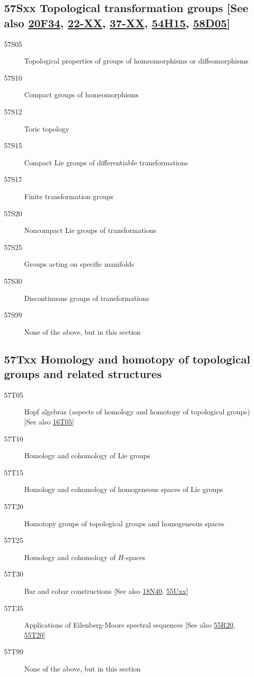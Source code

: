 \documentclass[letterpaper]{article}
\begin{document}
\subsection*{57Sxx  Topological transformation groups [See also \hyperref[20F34]{20F34}, \hyperref[22-XX]{22-XX}, \hyperref[37-XX]{37-XX}, \hyperref[54H15]{54H15}, \hyperref[58D05]{58D05}] }\label{57Sxx}
\begin{description}  
\item [57S05]\label{57S05} Topological properties of groups of homeomorphisms or diffeomorphisms
\item [57S10]\label{57S10} Compact groups of homeomorphisms
\item [57S12]\label{57S12} Toric topology
\item [57S15]\label{57S15} Compact Lie groups of differentiable transformations
\item [57S17]\label{57S17} Finite transformation groups
\item [57S20]\label{57S20} Noncompact Lie groups of transformations
\item [57S25]\label{57S25} Groups acting on specific manifolds
\item [57S30]\label{57S30} Discontinuous groups of transformations
\item [57S99]\label{57S99} None of the above, but in this section
\end{description}
\subsection*{57Txx  Homology and homotopy of topological groups and related structures }\label{57Txx}
\begin{description}  
\item [57T05]\label{57T05} Hopf algebras (aspects of homology and homotopy of topological groups) [See also \hyperref[16T05]{16T05}]
\item [57T10]\label{57T10} Homology and cohomology of Lie groups
\item [57T15]\label{57T15} Homology and cohomology of homogeneous spaces of Lie groups
\item [57T20]\label{57T20} Homotopy groups of topological groups and homogeneous spaces
\item [57T25]\label{57T25} Homology and cohomology of $H$-spaces
\item [57T30]\label{57T30} Bar and cobar constructions [See also \hyperref[18N40]{18N40}, \hyperref[55Uxx]{55Uxx}]
\item [57T35]\label{57T35} Applications of Eilenberg-Moore spectral sequences [See also \hyperref[55R20]{55R20}, \hyperref[55T20]{55T20}]
\item [57T99]\label{57T99} None of the above, but in this section
\end{description}
\end{document}
